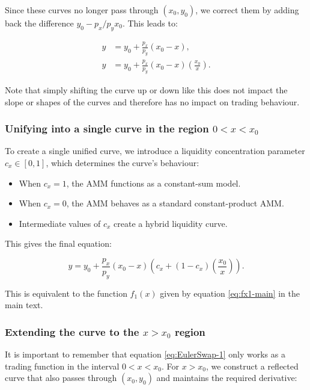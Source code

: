 \documentclass{article}
\begin{document}
Since these curves no longer pass through \( (x_0, y_0) \), we correct them by adding back the difference \( y_0 - p_x / p_y x_0 \). This leads to:

\begin{align}
    y &= y_0 + \frac{p_x}{p_y} (x_0 - x), \\
    y &= y_0 + \frac{p_x}{p_y} (x_0 - x) \left( \frac{x_0}{x} \right).
\end{align}

Note that simply shifting the curve up or down like this does not impact the slope or shapes of the curves and therefore has no impact on trading behaviour.

\subsubsection{Unifying into a single curve in the region $0 < x < x_0$}

To create a single unified curve, we introduce a liquidity concentration parameter \( c_x \in [0, 1] \), which determines the curve’s behaviour:

\begin{itemize}
    \item When \( c_x = 1 \), the AMM functions as a constant-sum model.
    \item When \( c_x = 0 \), the AMM behaves as a standard constant-product AMM.
    \item Intermediate values of \( c_x \) create a hybrid liquidity curve.
\end{itemize}

This gives the final equation:

\begin{equation}
    \label{eq:EulerSwap-1}
    y = y_0 + \frac{p_x}{p_y} (x_0 - x) \left( c_x + (1 - c_x) \left(\frac{x_0}{x}\right) \right).
\end{equation}

This is equivalent to the function \( f_1(x) \) given by equation \eqref{eq:fx1-main} in the main text.

\subsubsection{Extending the curve to the \( x > x_0 \) region}

It is important to remember that equation \eqref{eq:EulerSwap-1} only works as a trading function in the interval $0 < x < x_0$. For \( x > x_0 \), we construct a reflected curve that also passes through \( (x_0, y_0) \) and maintains the required derivative:
\end{document}
